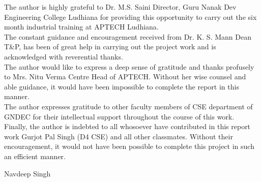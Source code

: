 \begin{Large}
\end{Large}
The author is highly grateful to Dr. M.S. Saini Director, Guru
Nanak Dev Engineering College Ludhiana for providing this
opportunity to carry out the six month industrial training at	 APTECH Ludhiana.\\

\noindent The constant guidance and encouragement received from Dr. K. S. Mann Dean T\&P, has been of great help in carrying out the project work and is acknowledged 
with reverential thanks.\\

\noindent The author would like to express a deep sense of gratitude and thanks profusely to Mrs. Nitu Verma Centre Head of APTECH. Without her wise counsel and able guidance, it would have been impossible to complete the report in this manner.\\

\noindent The author expresses gratitude to other faculty members of CSE department 
of GNDEC for their intellectual support throughout the course of this 
work.\\

\noindent Finally, the author is indebted to all whosoever have contributed in
this report work Gurjot Pal Singh (D4 CSE) and all other classmates. Without their 
encouragement, it would not have been possible to complete this project
in such an efficient manner.

\vskip 1.0cm 
\noindent Navdeep Singh
